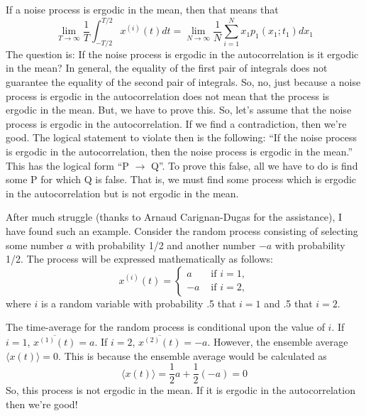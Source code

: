 \begin{homeworkProblem}
If a noise process is ergodic in the mean, then that means that \[ \lim_{T \to
\infty} \frac{1}{T} \int_{-T/2}^{T/2} x^{(i)}(t) dt = \lim_{N \to \infty}
\frac{1}{N} \sum^{N}_{i=1} x_{1}p_{1}(x_{1}; t_{1}) dx_{1} \] The question is:
If the noise process is ergodic in the autocorrelation is it ergodic in the
mean? In general, the equality of the first pair of integrals does not guarantee
the equality of the second pair of integrals. So, no, just because a noise
process is ergodic in the autocorrelation does not mean that the process is
ergodic in the mean. But, we have to prove this. So, let's assume that the noise
process is ergodic in the autocorrelation. If we find a contradiction, then
we're good.  The logical statement to violate then is the following: ``If the
noise process is ergodic in the autocorrelation, then the noise process is
ergodic in the mean.'' This has the logical form ``P $ \to $ Q''. To prove this
false, all we have to do is find some P for which Q is false. That is, we must
find some process which is ergodic in the autocorrelation but is not ergodic in
the mean.

After much struggle (thanks to Arnaud Carignan-Dugas for the assistance), I have
found such an example. Consider the random process consisting of selecting some
number $ a $ with probability 1/2 and another number $ -a $ with probability
1/2. The process will be expressed mathematically as follows:
\[
   x^{(i)}(t) = \begin{cases}
      a &\text{ if } i = 1, \\
      -a &\text{ if } i = 2,
   \end{cases}
   \]
   where $ i $ is a random variable with probability .5 that $ i=1 $ and
   .5 that $ i=2 $.

The time-average for the random process is conditional upon the value of $ i $.
If $ i = 1 $, $ \overline{x^{(1)}(t)} = a $. If $ i = 2 $, $
\overline{x^{(2)}(t)} = -a $. However, the ensemble average $ \langle x(t)
\rangle = 0 $. This is because the ensemble average would be calculated as
\[
   \langle x(t) \rangle = \frac{1}{2}a + \frac{1}{2}(-a) = 0
\]
So, this process is not ergodic in the mean. If it is ergodic in the
autocorrelation then we're good!


\end{homeworkProblem}
